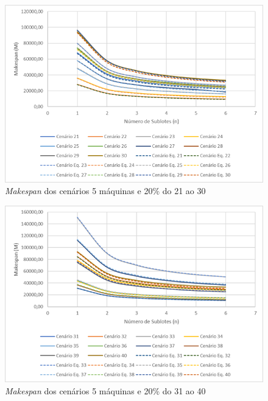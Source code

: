 \begin{figure}[H]
    \centering
    \includegraphics[width=13cm]{Apendices/Figuras/05m20_21-30}
    \caption{\textit{Makespan} dos cenários 5 máquinas e 20\% do 21 ao 30}
    \label{fig:05m20_21-30}
\end{figure}

\begin{figure}[H]
    \centering
    \includegraphics[width=13cm]{Apendices/Figuras/05m20_31-40}
    \caption{\textit{Makespan} dos cenários 5 máquinas e 20\% do 31 ao 40}
    \label{fig:05m20_31-40}
\end{figure}

